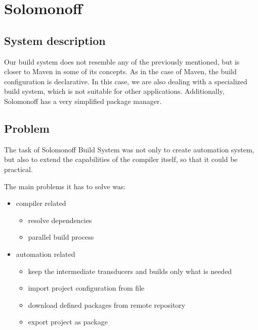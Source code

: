 \hypertarget{solomonoff}{%
\section{Solomonoff}\label{solomonoff}}

\hypertarget{system-description}{%
\subsection{System description}\label{system-description}}

Our build system does not resemble any of the previously mentioned, but
is closer to Maven in some of its concepts. As in the case of Maven, the
build configuration is declarative. In this case, we are also dealing
with a specialized build system, which is not suitable for other
applications. Additionally, Solomonoff has a very simplified package
manager.

\hypertarget{problem}{%
\subsection{Problem}\label{problem}}

The task of Solomonoff Build System was not only to create automation
system, but also to extend the capabilities of the compiler itself, so
that it could be practical.

The main problems it has to solve was:

\begin{itemize}
\tightlist
\item
  compiler related

  \begin{itemize}
  \tightlist
  \item
    resolve dependencies
  \item
    parallel build process
  \end{itemize}
\item
  automation related

  \begin{itemize}
  \tightlist
  \item
    keep the intermediate transducers and builds only what is needed
  \item
    import project configuration from file
  \item
    download defined packages from remote repository
  \item
    export project as package
  \end{itemize}
\end{itemize}

